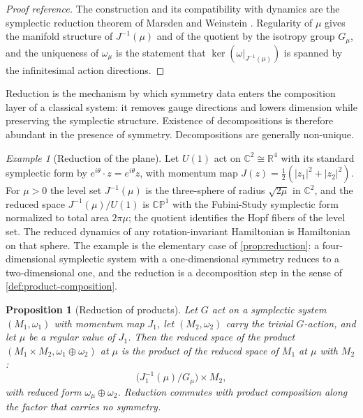 \documentclass[11pt,letterpaper]{article}
\newtheorem{proposition}[theorem]{Proposition}
\theoremstyle{definition}
\theoremstyle{remark}
\newtheorem{example}[theorem]{Example}
\begin{document}
\begin{proof}[Proof reference]
The construction and its compatibility with dynamics are the symplectic reduction theorem of Marsden and Weinstein \cite{marsden-weinstein}. Regularity of $\mu$ gives the manifold structure of $J^{-1}(\mu)$ and of the quotient by the isotropy group $G_{\mu}$, and the uniqueness of $\omega_{\mu}$ is the statement that $\ker (\omega|_{J^{-1}(\mu)})$ is spanned by the infinitesimal action directions.
\end{proof}

Reduction is the mechanism by which symmetry data enters the composition layer of a classical system: it removes gauge directions and lowers dimension while preserving the symplectic structure. Existence of decompositions is therefore abundant in the presence of symmetry. Decompositions are generally non-unique.

\begin{example}[Reduction of the plane]
\label{ex:reduction-sphere}
Let $U(1)$ act on $\mathbb{C}^{2} \cong \mathbb{R}^{4}$ with its standard symplectic form by $e^{i\theta} \cdot z = e^{i\theta} z$, with momentum map $J(z) = \tfrac{1}{2} (|z_1|^{2} + |z_2|^{2})$. For $\mu > 0$ the level set $J^{-1}(\mu)$ is the three-sphere of radius $\sqrt{2\mu}$ in $\mathbb{C}^{2}$, and the reduced space $J^{-1}(\mu) / U(1)$ is $\mathbb{CP}^{1}$ with the Fubini-Study symplectic form normalized to total area $2\pi \mu$; the quotient identifies the Hopf fibers of the level set. The reduced dynamics of any rotation-invariant Hamiltonian is Hamiltonian on that sphere. The example is the elementary case of \cref{prop:reduction}: a four-dimensional symplectic system with a one-dimensional symmetry reduces to a two-dimensional one, and the reduction is a decomposition step in the sense of \cref{def:product-composition}.
\end{example}

\begin{proposition}[Reduction of products]
\label{prop:reduction-products}
Let $G$ act on a symplectic system $(M_1, \omega_1)$ with momentum map $J_1$, let $(M_2, \omega_2)$ carry the trivial $G$-action, and let $\mu$ be a regular value of $J_1$. Then the reduced space of the product $(M_1 \times M_2, \omega_1 \oplus \omega_2)$ at $\mu$ is the product of the reduced space of $M_1$ at $\mu$ with $M_2$:
\[
\big( J_1^{-1}(\mu) / G_{\mu} \big) \times M_2,
\]
with reduced form $\omega_{\mu} \oplus \omega_2$. Reduction commutes with product composition along the factor that carries no symmetry.
\end{proposition}
\end{document}
